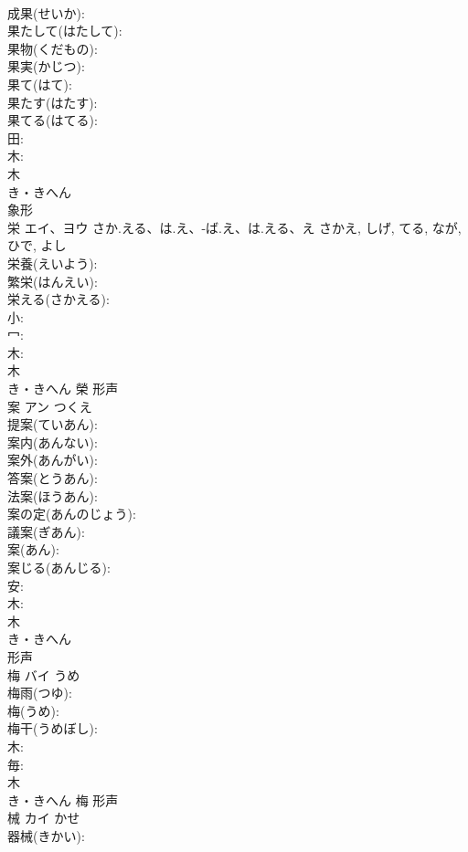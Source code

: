 \documentclass[8pt]{extreport}
\begin{document}
\begin{CJK}{UTF8}{min}
\\	成果(せいか): 
\\	果たして(はたして): 
\\	果物(くだもの): 
\\	果実(かじつ): 
\\	果て(はて): 
\\	果たす(はたす): 
\\	果てる(はてる): 
\\	田: 
\\	木: 
\\	木	
\\	き・きへん	
\\	象形 
\\	栄	エイ、ヨウ	さか.える、は.え、-ば.え、は.える、え	さかえ, しげ, てる, なが, ひで, よし	
\\	栄養(えいよう): 
\\	繁栄(はんえい): 
\\	栄える(さかえる): 
\\	小: 
\\	冖: 
\\	木: 
\\	木	
\\	き・きへん	榮	形声 
\\	案	アン	つくえ		
\\	提案(ていあん): 
\\	案内(あんない): 
\\	案外(あんがい): 
\\	答案(とうあん): 
\\	法案(ほうあん): 
\\	案の定(あんのじょう): 
\\	議案(ぎあん): 
\\	案(あん): 
\\	案じる(あんじる): 
\\	安: 
\\	木: 
\\	木	
\\	き・きへん	
\\	形声 
\\	梅	バイ	うめ		
\\	梅雨(つゆ): 
\\	梅(うめ): 
\\	梅干(うめぼし): 
\\	木: 
\\	毎: 
\\	木	
\\	き・きへん	梅	形声 
\\	械	カイ	かせ		
\\	器械(きかい): 

\end{CJK}
\end{document}
